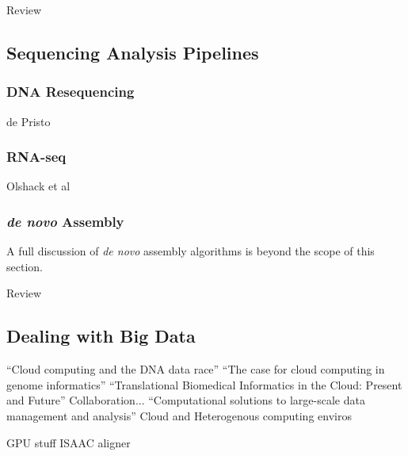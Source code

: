 Review~\cite{Shendure:2008jh}

\subsection{Sequencing Analysis Pipelines}\label{section_pipelines}

\subsubsection{DNA Resequencing}

de Pristo\cite{DePristo:2011fo}

\subsubsection{RNA-seq}

Olshack et al\cite{Oshlack:2010kr}

\subsubsection{\emph{de novo} Assembly}

A full discussion of \emph{de novo} assembly algorithms is beyond the scope of this section.

Review\cite{Nagarajan:2013cq}

\subsection{Dealing with Big Data}

``Cloud computing and the DNA data race''\cite{Schatz:2010js}
``The case for cloud computing in genome informatics''\cite{Stein:2010gp}
``Translational Biomedical Informatics in the Cloud: Present and Future''\cite{Chen:2013ci} Collaboration...
``Computational solutions to large-scale data management and analysis''\cite{Schadt:2010dp} Cloud and Heterogenous computing enviros


GPU stuff
ISAAC aligner~\cite{Raczy:2013hy}